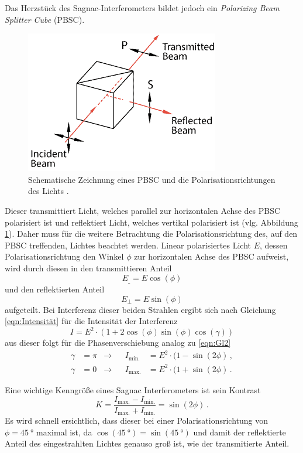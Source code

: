 Das Herzstück des Sagnac-Interferometers bildet jedoch ein \textit{Polarizing Beam Splitter Cube} (PBSC).
\begin{figure}
\includegraphics[width = .3\textwidth]{bilder/sketch-polarizing-cube-beamsplitter.png}
\caption{Schematische Zeichnung eines PBSC und die Polarisationsrichtungen des Lichts \cite{PBSC}.}
\label{fig:PBSC}
\end{figure}
Dieser transmittiert Licht, welches parallel zur horizontalen Achse des PBSC polarisiert ist und reflektiert Licht, welches vertikal polarisiert ist (vlg. Abbildung \ref{fig:PBSC}).
Daher muss für die weitere Betrachtung die Polarisationsrichtung des, auf den PBSC treffenden, Lichtes beachtet werden.
Linear polarisiertes Licht $E$, dessen Polarisationsrichtung den Winkel $\phi$ zur horizontalen Achse des PBSC aufweist, wird durch diesen in den transmittieren Anteil
\begin{equation*}
  E_{\_} = E \cos(\phi)
\end{equation*}
und den reflektierten Anteil
\begin{equation*}
  E_{\bot} = E \sin(\phi)
\end{equation*}
aufgeteilt.
\medskip
Bei Interferenz dieser beiden Strahlen ergibt sich nach Gleichung \eqref{eqn:Intensität} für die Intensität der Interferenz
\begin{equation*}
  I = E^2 \cdot (1 + 2 \cos(\phi) \sin(\phi) \cos(\gamma))
\end{equation*}
aus dieser folgt für die Phasenverschiebung analog zu \eqref{eqn:Gl2}
\begin{equation}  \label{eqn:Gl3}
  \begin{aligned}
  \gamma &= \pi &\rightarrow& &I_\text{min.} &= E^2 \cdot (1 − \sin(2\phi) \, , \\
  \gamma &= 0 &\rightarrow& &I_\text{max.} &= E^2 \cdot (1 + \sin(2\phi) \, .
\end{aligned}
\end{equation}

Eine wichtige Kenngröße eines Sagnac Interferometers ist sein Kontrast
\begin{equation}
  K = \frac{I_\text{max.} - I_\text{min.}}{I_\text{max.} + I_\text{min.}} = \sin(2\phi) \, .
  \label{eqn:Kontrast}
\end{equation}
Es wird schnell ersichtlich, dass dieser bei einer Polarisationsrichtung von $\phi = \SI{45}{\degree}$ maximal ist, da $\cos(\SI{45}{\degree}) = \sin(\SI{45}{\degree})$ und damit der reflektierte Anteil des eingestrahlten Lichtes genauso groß ist, wie der transmitierte Anteil.


